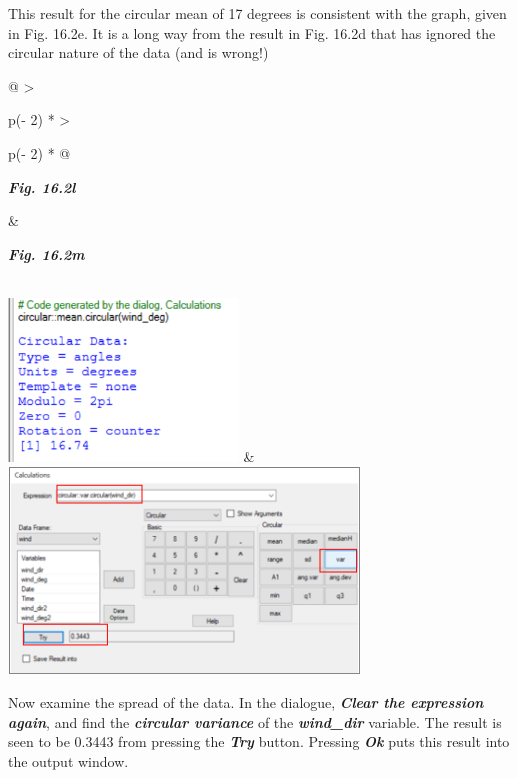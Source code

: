 \documentclass[
  letterpaper,
  DIV=11,
  numbers=noendperiod]{scrreprt}
\begin{document}
This result for the circular mean of 17 degrees is consistent with the
graph, given in Fig. 16.2e. It is a long way from the result in Fig.
16.2d that has ignored the circular nature of the data (and is wrong!)

\begin{longtable}[]{@{}
  >{\raggedright\arraybackslash}p{(\columnwidth - 2\tabcolsep) * }
  >{\raggedright\arraybackslash}p{(\columnwidth - 2\tabcolsep) * }@{}}
\toprule\noalign{}
\begin{minipage}[b]{\linewidth}\raggedright
\textbf{\emph{Fig. 16.2l}}
\end{minipage} & \begin{minipage}[b]{\linewidth}\raggedright
\textbf{\emph{Fig. 16.2m}}
\end{minipage} \\
\midrule\noalign{}
\endhead
\bottomrule\noalign{}
\endlastfoot
\includegraphics[width=2.40545in,height=1.71083in]{figures/Fig16.2l.png}
&
\includegraphics[width=3.68074in,height=2.16253in]{figures/Fig16.2m.png} \\
\end{longtable}

Now examine the spread of the data. In the dialogue, \textbf{\emph{Clear
the expression again}}, and find the \textbf{\emph{circular variance}}
of the \textbf{\emph{wind\_dir}} variable. The result is seen to be
0.3443 from pressing the \textbf{\emph{Try}} button. Pressing
\textbf{\emph{Ok}} puts this result into the output window.
\end{document}
